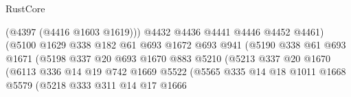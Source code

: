 \begin{lexlean}{RustCore}
\begin{coremodule}
                                          (@4397 (@4416 @1603 @1619)))
                                        @4432
                                        @4436
                                        @4441
                                        @4446
                                        @4452
                                        @4461)
                                      (@5100
                                        @1629
                                        @338
                                        @182
                                        @61
                                        @693
                                        @1672
                                        @693
                                        @941
                                        (@5190
                                          @338
                                          @61
                                          @693
                                          @1671
                                          (@5198
                                            @337
                                            @20
                                            @693
                                            @1670
                                            @883
                                            @5210
                                            (@5213
                                              @337
                                              @20
                                              @1670
                                              (@6113
                                                @336
                                                @14
                                                @19
                                                @742
                                                @1669
                                                @5522
                                                (@5565
                                                  @335
                                                  @14
                                                  @18
                                                  @1011
                                                  @1668
                                                  @5579
                                                  (@5218
                                                    @333
                                                    @311
                                                    @14
                                                    @17
                                                    @1666

\end{coremodule}
\end{lexlean}
